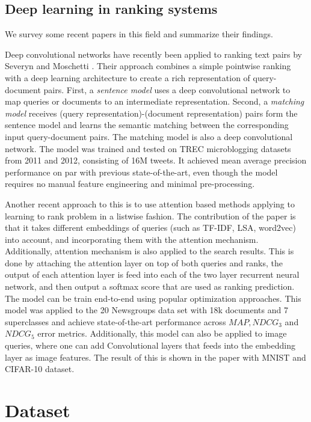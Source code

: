 \documentclass[english]{article}
\theoremstyle{definition}
\begin{document}
\begin{multicols}{2}
\subsection{Deep learning in ranking systems}

We survey some recent papers in this field and summarize their findings.

Deep convolutional networks have recently been applied to ranking text pairs by Severyn and Moschetti \cite{severyn2015learning}.  Their approach combines a simple pointwise ranking with a deep learning architecture to create a rich representation of query-document pairs.  First, a \textit{sentence model} uses a deep convolutional network to map queries or documents to an intermediate representation.  Second, a \textit{matching model} receives (query representation)-(document representation) pairs form the sentence model and learns the semantic matching between the corresponding input query-document pairs.  The matching model is also a  deep convolutional network.  The model was trained and tested on TREC microblogging datasets from 2011 and 2012, consisting of 16M tweets.  It achieved mean average precision performance on par with previous state-of-the-art, even though the model requires no manual feature engineering and minimal pre-processing.

Another recent approach to this is to use attention based methods applying to  learning to rank problem \cite{wang2017attention} in a listwise fashion. The contribution of the paper is that it takes different embeddings of queries (such as TF-IDF, LSA, word2vec) into account, and incorporating them with the attention mechanism. Additionally, attention mechanism is also applied to the search results. This is done by attaching the attention layer on top of both queries and ranks, the output of each attention layer is feed into each of the two layer recurrent neural network, and then output a softmax score that are used as ranking prediction. The model can be train end-to-end using popular optimization approaches. This model was applied to the 20 Newsgroups data set with 18k documents and 7 superclasses and achieve state-of-the-art performance across $MAP, NDCG_3$ and $NDCG_5$ error metrics. Additionally, this model can also be applied to image queries, where one can add Convolutional layers that feeds  into the embedding layer as image features. The result of this is shown in the paper with MNIST and CIFAR-10 dataset.

\section{Dataset}


\end{multicols}
\end{document}
